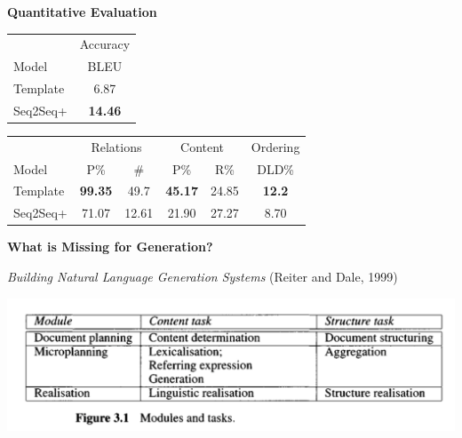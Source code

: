 \documentclass[aspectratio=169,12pt]{beamer}
\begin{document}
\begin{frame}
  \centerline{\textbf{Quantitative Evaluation }}
  \begin{table}
    \small
    \centering

    \begin{tabular}{lc}
      \toprule
       & Accuracy \\
      Model  & BLEU\\
      \midrule
      Template                 &  6.87    \\
      \midrule
      Seq2Seq+       &    \textbf{14.46}\\
      \bottomrule
    \end{tabular}

    \pause
    \vspace{0.5cm}

    \begin{tabular}{lccccc}
      \toprule
       & \multicolumn{2}{c}{Relations}  & \multicolumn{2}{c}{Content} & Ordering \\
      Model & P\% & \# & P\% & R\% & DLD\%  \\
      \midrule
      Template                 & \textbf{99.35} & 49.7  & \textbf{45.17} & 24.85 & \textbf{12.2} \\
      \midrule
      Seq2Seq+       &   71.07 & 12.61 & 21.90 & 27.27 & 8.70 \\
      \bottomrule
    \end{tabular}
  \end{table}
\end{frame}






\begin{frame}
  \begin{center}
    \textbf{ What is Missing for  Generation? }
  \end{center}

    \textit{Building Natural Language Generation Systems} (Reiter and Dale, 1999)

 \begin{center}
    \includegraphics[width=\linewidth]{datadoc}
  \end{center}

\end{frame}
\end{document}
